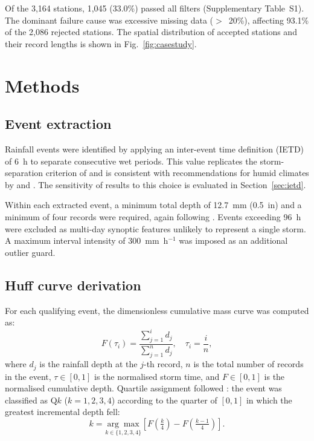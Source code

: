 \documentclass[a4paper,fleqn]{cas-sc}
\begin{document}
Of the 3,164 stations, 1,045 (33.0\%) passed all filters
(Supplementary Table~S1). The dominant failure cause was excessive
missing data ($>$~20\%), affecting 93.1\% of the 2,086 rejected
stations. The spatial distribution of accepted stations and their
record lengths is shown in Fig.~\ref{fig:casestudy}.

\section{Methods}
\label{sec:methods}

\subsection{Event extraction}
\label{sec:event_extraction}

Rainfall events were identified by applying an inter-event time
definition (IETD) of 6~h to separate consecutive wet periods. This
value replicates the storm-separation criterion of \citet{Huff1967}
and is consistent with recommendations for humid climates by
\citet{RestrepoPosada1982} and \citet{BontaRao1988}. The sensitivity
of results to this choice is evaluated in Section~\ref{sec:ietd}.

Within each extracted event, a minimum total depth of 12.7~mm
(0.5~in) and a minimum of four records were required, again following
\citet{Huff1967}. Events exceeding 96~h were excluded as multi-day
synoptic features unlikely to represent a single storm. A maximum
interval intensity of 300~mm~h$^{-1}$ was imposed as an additional
outlier guard.

\subsection{Huff curve derivation}

For each qualifying event, the dimensionless cumulative mass curve
was computed as:
\begin{equation}
  F(\tau_i) = \frac{\sum_{j=1}^{i} d_j}{\sum_{j=1}^{n} d_j},
  \quad \tau_i = \frac{i}{n},
  \label{eq:cdf}
\end{equation}
where $d_j$ is the rainfall depth at the $j$-th record, $n$ is
the total number of records in the event, $\tau \in [0,1]$ is the
normalised storm time, and $F \in [0,1]$ is the normalised cumulative
depth. Quartile assignment followed \citet{Huff1967}: the event was
classified as Q$k$ ($k = 1, 2, 3, 4$) according to the quarter of
$[0, 1]$ in which the greatest incremental depth fell:
\begin{equation}
  k = \underset{k \in \{1,2,3,4\}}{\arg\max}
        \left[ F\!\left(\tfrac{k}{4}\right) -
               F\!\left(\tfrac{k-1}{4}\right) \right].
\end{equation}
\end{document}
